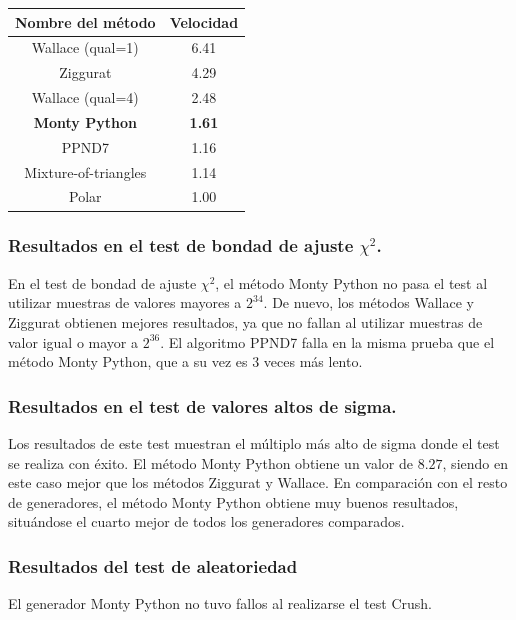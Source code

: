 \documentclass[a4paper,12pt]{article}
\begin{document}
	\begin{table}[H]
		\centering
		\begin{tabular}{|c||c|}
			\hline
			Nombre del método     & Velocidad     \\ \hline \hline
			Wallace (qual=1)      & 6.41          \\ \hline
			Ziggurat              & 4.29          \\ \hline
			Wallace (qual=4)      & 2.48          \\ \hline
			\textbf{Monty Python} & \textbf{1.61} \\ \hline
			PPND7                 & 1.16          \\ \hline
			Mixture-of-triangles  & 1.14          \\ \hline
			Polar                 & 1.00          \\ \hline   
		\end{tabular}
	\end{table}
	
	\subsubsection{Resultados en el test de bondad de ajuste $\chi^{2}$.}
	En el test de bondad de ajuste $\chi^{2}$, el método Monty Python no pasa el test al utilizar muestras de valores mayores a $2^{34}$. De nuevo, los métodos Wallace y Ziggurat obtienen mejores resultados, ya que no fallan al utilizar muestras de valor igual o mayor a $2^{36}$. El algoritmo PPND7 falla en la misma prueba que el método Monty Python, que a su vez es $3$ veces más lento.
	
	\subsubsection{Resultados en el test de valores altos de sigma.}
	Los resultados de este test muestran el múltiplo más alto de sigma donde el test se realiza con éxito. El método Monty Python obtiene un valor de $8.27$, siendo en este caso mejor que los métodos Ziggurat y Wallace. En comparación con el resto de generadores, el método Monty Python obtiene muy buenos resultados, situándose el cuarto mejor de todos los generadores comparados.
	
	\subsubsection{Resultados del test de aleatoriedad}

	El generador Monty Python no tuvo fallos al realizarse el test Crush.
	
\end{document}
